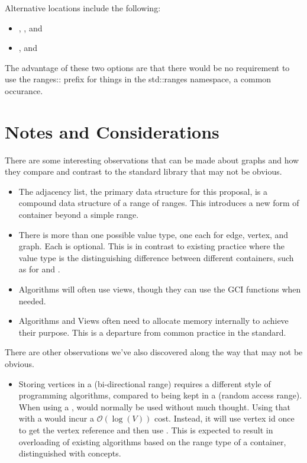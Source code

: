 \noindent
Alternative locations include the following:
\begin{itemize}
\item[], , and 
\item[],  and 
\end{itemize}
The advantage of these two options are that there would be no requirement to use the ranges:: prefix for things
in the std::ranges namespace, a common occurance.

\section{Notes and Considerations}
There are some interesting observations that can be made about graphs and how they compare and contrast to the 
standard library that may not be obvious.
\begin{itemize}
      \item The adjacency list, the primary data structure for this proposal, is a compound data structure of a
            range of ranges. This introduces a new form of container beyond a simple range.
      \item There is more than one possible value type, one each for edge, vertex, and graph. Each is optional.
            This is in contrast to existing practice where the value type is the distinguishing difference between
            different containers, such as for  and .
      \item Algorithms will often use views, though they can use the GCI functions when needed.
      \item Algorithms and Views often need to allocate memory internally to achieve their purpose. This is a departure from
            common practice in the standard.
\end{itemize}

There are other observations we've also discovered along the way that may not be obvious.
\begin{itemize}
      \item Storing vertices in a  (bi-directional range) requires a different style of programming 
            algorithms, compared to being kept in a  (random access range). When using a ,
             would normally be used without much thought. Using that with a  would
            incur a $\mathcal{O}(\log(V))$ cost. Instead, it will use vertex id once to get the vertex reference 
            and then use . This is expected to result in overloading of existing algorithms based on the
            range type of a container, distinguished with concepts.
\end{itemize}

